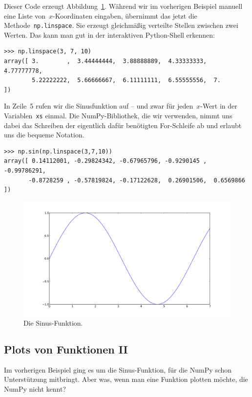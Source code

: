 \documentclass{blatt}
\begin{document}
Dieser Code erzeugt Abbildung~\ref{fig:sine-graph}. Während wir im vorherigen
Beispiel manuell eine Liste von~$x$-Koordinaten eingaben, übernimmt das
jetzt die Methode~\texttt{np.linspace}. Sie erzeugt gleichmäßig
verteilte Stellen zwischen zwei Werten. Das kann man gut in der interaktiven
Python-Shell erkennen:
\begin{verbatim}
>>> np.linspace(3, 7, 10)
array([ 3.        ,  3.44444444,  3.88888889,  4.33333333,  4.77777778,
        5.22222222,  5.66666667,  6.11111111,  6.55555556,  7.        ])
\end{verbatim}
In Zeile~5 rufen wir die Sinusfunktion auf -- und zwar für jeden~$x$-Wert in
der Variablen~\texttt{xs} einmal. Die NumPy-Bibliothek, die wir
verwenden, nimmt uns dabei das Schreiben der eigentlich dafür benötigten
For-Schleife ab und erlaubt uns die bequeme Notation.
\begin{verbatim}
>>> np.sin(np.linspace(3,7,10))
array([ 0.14112001, -0.29824342, -0.67965796, -0.9290145 , -0.99786291,
       -0.8728259 , -0.57819824, -0.17122628,  0.26901506,  0.6569866 ])
\end{verbatim}

\begin{figure}
  \centering
  \includegraphics[scale=0.4]{sine-graph}
  \caption{\label{fig:sine-graph}Die Sinus-Funktion.}
\end{figure}


\subsection{Plots von Funktionen II}

Im vorherigen Beispiel ging es um die Sinus-Funktion, für die NumPy schon
Unterstützung mitbringt. Aber was, wenn man eine Funktion plotten möchte, die
NumPy nicht kennt?
\end{document}
